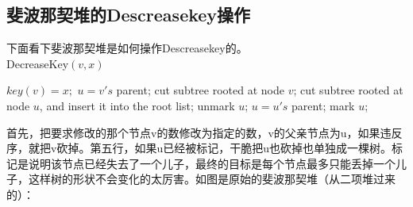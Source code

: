 \subsection{斐波那契堆的Descreasekey操作}
下面看下斐波那契堆是如何操作Descreasekey的。\\
{\sc DecreaseKey}$(v, x)$
\begin{algorithmic}[1]
\STATE $key(v) = x;$
\STATE $u = v's$ parent; 
\STATE cut subtree rooted at node $v$; 
\STATE cut subtree rooted at node $u$, and insert it into the root list;
\STATE unmark $u$;  
\STATE $u = u's$ parent; 
\ENDWHILE	
\STATE mark $u$; 
\ENDIF
\end{algorithmic}

首先，把要求修改的那个节点v的数修改为指定的数，v的父亲节点为u，如果违反序，就把v砍掉。第五行，如果u已经被标记，干脆把u也砍掉也单独成一棵树。标记是说明该节点已经失去了一个儿子，最终的目标是每个节点最多只能丢掉一个儿子，这样树的形状不会变化的太厉害。如图是原始的斐波那契堆（从二项堆过来的）：

